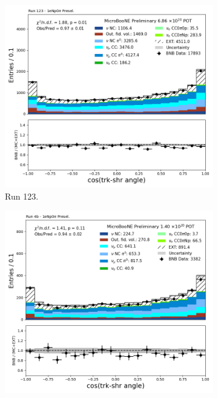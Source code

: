\begin{figure}[H]
    \centering
    \begin{subfigure}[t]{0.32\linewidth}
        \includegraphics[width=\linewidth]{technote/Appendix_Preselection/Figures/1eNp0pi/Run123/tksh_angle_Run123_1eNp0pi_Presel.png}
        \caption{Run 123.}
    \end{subfigure}%
    \hspace{0.2cm}%
    \begin{subfigure}[t]{0.32\linewidth}
        \includegraphics[width=\linewidth]{technote/Appendix_Preselection/Figures/1eNp0pi/Run4b/tksh_angle_Run4b_1eNp0pi_Presel.png}

\end{subfigure}
\end{figure}
